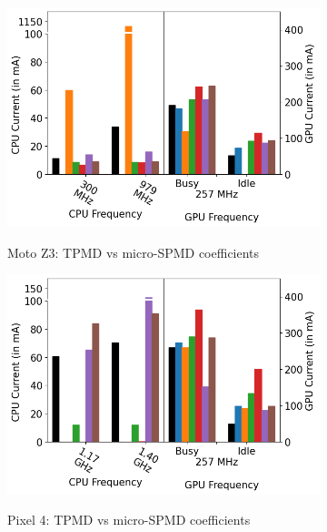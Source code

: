 \begin{figure}[tp]
\begin{subfigure}[b]{0.32\textwidth}
         \includegraphics[width=\textwidth]{figures/003_MotoZ3_16_micro_equations.png}
         \label{fig:micro_equations_z3}
         \vspace{-0.25in}
         \caption{Moto Z3: TPMD vs micro-SPMD coefficients}
     \end{subfigure}
    \begin{subfigure}[b]{0.32\textwidth}
         \centering
         \includegraphics[width=\textwidth]{figures/004_Pixel4_16_micro_equations.png}
         \label{fig:micro_equations_p4}
         \vspace{-0.25in}
         \caption{Pixel 4: TPMD vs micro-SPMD coefficients}
     \end{subfigure}
     \hfill
     \vspace{+0.1in}
     \centering
     \begin{subfigure}[b]{0.31\textwidth}

\end{subfigure}
\end{figure}
